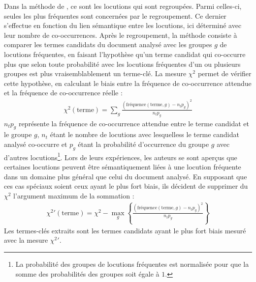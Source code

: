           Dans la méthode de \citet{matsuo2004wordcooccurrence}, ce sont les
          locutions qui sont regroupées. Parmi celles-ci, seules les plus fréquentes
          sont concernées par le regroupement. Ce dernier s'effectue en fonction du
          lien sémantique entre les locutions, ici déterminé avec leur nombre de
          co-occurrences. Après le regroupement, la méthode consiste à comparer les
          termes candidats du document analysé avec les groupes $g$ de locutions
          fréquentes, en faisant l'hypothèse qu'un terme candidat qui co-occurre plus
          que selon toute probabilité avec les locutions fréquentes d'un ou plusieurs
          groupes est plus vraisemblablement un terme-clé. La mesure $\chi^2$ permet
          de vérifier cette hypothèse, en calculant le biais entre la fréquence de
          co-occurrence attendue et la fréquence de co-occurrence réelle :
          \begin{align}
            \chi^2(\text{terme}) = \sum_{g} \frac{(\text{fréquence}(\text{terme}, g) - n_tp_g)^2}{n_tp_g}
          \end{align}
          $n_tp_g$ représente la fréquence de co-occurrence attendue entre le terme candidat
          et le groupe $g$, $n_t$ étant le nombre de locutions avec lesquelless le terme candidat
          analysé co-occurre et $p_g$ étant la probabilité d'occurrence du groupe
          $g$ avec d'autres locutions\footnote{La probabilité des groupes de locutions
          fréquentes est normalisée pour que la somme des probabilités des groupes
          soit égale à $1$.}. Lors de leurs expériences, les auteurs se sont aperçus
          que certaines locutions peuvent être sémantiquement liées à une locution fréquente
          dans un domaine plus général que celui du document analysé. En supposant
          que ces cas spéciaux soient ceux ayant le plus fort biais, ils décident de
          supprimer du $\chi^2$ l'argument maximum de la sommation :
          \begin{align}
            \chi^2{'}(\text{terme}) = \chi^2 - \max_{g}\left\{\frac{(\text{fréquence}(\text{terme}, g) - n_tp_g)^2}{n_tp_g}\right\}
          \end{align}
          Les termes-clés extraits sont les termes candidats ayant le plus fort
          biais mesuré avec la mesure $\chi^2{'}$.

